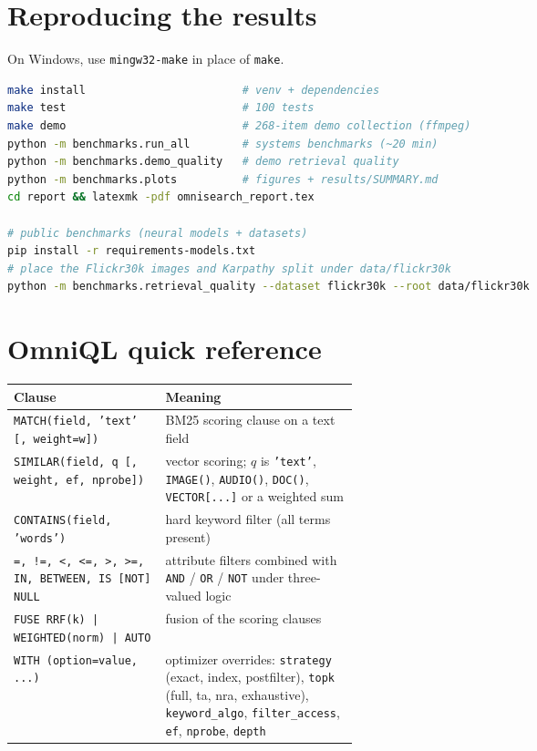 \documentclass[11pt,a4paper]{article}
\newcommand{\code}[1]{\texttt{\small #1}}
\begin{document}
\appendix
\section{Reproducing the results}
\label{app:repro}

\noindent On Windows, use \code{mingw32-make} in place of \code{make}.
\begin{lstlisting}[language=bash]
make install                        # venv + dependencies
make test                           # 100 tests
make demo                           # 268-item demo collection (ffmpeg)
python -m benchmarks.run_all        # systems benchmarks (~20 min)
python -m benchmarks.demo_quality   # demo retrieval quality
python -m benchmarks.plots          # figures + results/SUMMARY.md
cd report && latexmk -pdf omnisearch_report.tex

# public benchmarks (neural models + datasets)
pip install -r requirements-models.txt
# place the Flickr30k images and Karpathy split under data/flickr30k
python -m benchmarks.retrieval_quality --dataset flickr30k --root data/flickr30k
\end{lstlisting}

\section{OmniQL quick reference}
\begin{center}\small
\begin{tabularx}{\linewidth}{>{\raggedright\arraybackslash}p{0.44\linewidth}L}
\toprule
Clause & Meaning \\
\midrule
\code{MATCH(field, 'text' [, weight=w])} & BM25 scoring clause on a text field \\
\code{SIMILAR(field, q [, weight, ef, nprobe])} & vector scoring; $q$ is \code{'text'}, \code{IMAGE()}, \code{AUDIO()}, \code{DOC()}, \code{VECTOR[...]} or a weighted sum \\
\code{CONTAINS(field, 'words')} & hard keyword filter (all terms present) \\
\code{=, !=, <, <=, >, >=, IN, BETWEEN, IS [NOT] NULL} & attribute filters combined with \code{AND} / \code{OR} / \code{NOT} under three-valued logic \\
\code{FUSE RRF(k) | WEIGHTED(norm) | AUTO} & fusion of the scoring clauses \\
\code{WITH (option=value, ...)} & optimizer overrides: \code{strategy} (exact, index, postfilter), \code{topk} (full, ta, nra, exhaustive), \code{keyword\_algo}, \code{filter\_access}, \code{ef}, \code{nprobe}, \code{depth} \\
\bottomrule
\end{tabularx}
\end{center}
\end{document}

